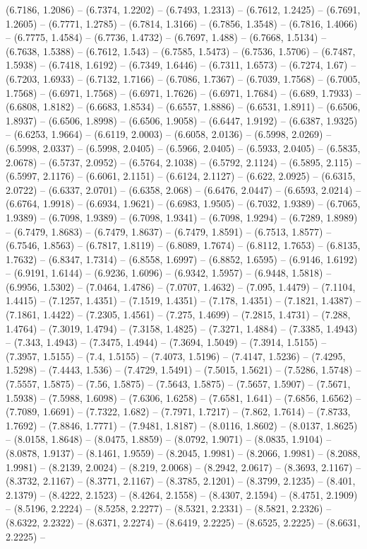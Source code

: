 (6.7186, 1.2086) -- (6.7374, 1.2202) -- (6.7493, 1.2313) -- (6.7612, 1.2425) -- (6.7691, 1.2605) -- (6.7771, 1.2785) -- (6.7814, 1.3166) -- (6.7856, 1.3548) -- (6.7816, 1.4066) -- (6.7775, 1.4584) -- (6.7736, 1.4732) -- (6.7697, 1.488) -- (6.7668, 1.5134) -- (6.7638, 1.5388) -- (6.7612, 1.543) -- (6.7585, 1.5473) -- (6.7536, 1.5706) -- (6.7487, 1.5938) -- (6.7418, 1.6192) -- (6.7349, 1.6446) -- (6.7311, 1.6573) -- (6.7274, 1.67) -- (6.7203, 1.6933) -- (6.7132, 1.7166) -- (6.7086, 1.7367) -- (6.7039, 1.7568) -- (6.7005, 1.7568) -- (6.6971, 1.7568) -- (6.6971, 1.7626) -- (6.6971, 1.7684) -- (6.689, 1.7933) -- (6.6808, 1.8182) -- (6.6683, 1.8534) -- (6.6557, 1.8886) -- (6.6531, 1.8911) -- (6.6506, 1.8937) -- (6.6506, 1.8998) -- (6.6506, 1.9058) -- (6.6447, 1.9192) -- (6.6387, 1.9325) -- (6.6253, 1.9664) -- (6.6119, 2.0003) -- (6.6058, 2.0136) -- (6.5998, 2.0269) -- (6.5998, 2.0337) -- (6.5998, 2.0405) -- (6.5966, 2.0405) -- (6.5933, 2.0405) -- (6.5835, 2.0678) -- (6.5737, 2.0952) -- (6.5764, 2.1038) -- (6.5792, 2.1124) -- (6.5895, 2.115) -- (6.5997, 2.1176) -- (6.6061, 2.1151) -- (6.6124, 2.1127) -- (6.622, 2.0925) -- (6.6315, 2.0722) -- (6.6337, 2.0701) -- (6.6358, 2.068) -- (6.6476, 2.0447) -- (6.6593, 2.0214) -- (6.6764, 1.9918) -- (6.6934, 1.9621) -- (6.6983, 1.9505) -- (6.7032, 1.9389) -- (6.7065, 1.9389) -- (6.7098, 1.9389) -- (6.7098, 1.9341) -- (6.7098, 1.9294) -- (6.7289, 1.8989) -- (6.7479, 1.8683) -- (6.7479, 1.8637) -- (6.7479, 1.8591) -- (6.7513, 1.8577) -- (6.7546, 1.8563) -- (6.7817, 1.8119) -- (6.8089, 1.7674) -- (6.8112, 1.7653) -- (6.8135, 1.7632) -- (6.8347, 1.7314) -- (6.8558, 1.6997) -- (6.8852, 1.6595) -- (6.9146, 1.6192) -- (6.9191, 1.6144) -- (6.9236, 1.6096) -- (6.9342, 1.5957) -- (6.9448, 1.5818) -- (6.9956, 1.5302) -- (7.0464, 1.4786) -- (7.0707, 1.4632) -- (7.095, 1.4479) -- (7.1104, 1.4415) -- (7.1257, 1.4351) -- (7.1519, 1.4351) -- (7.178, 1.4351) -- (7.1821, 1.4387) -- (7.1861, 1.4422) -- (7.2305, 1.4561) -- (7.275, 1.4699) -- (7.2815, 1.4731) -- (7.288, 1.4764) -- (7.3019, 1.4794) -- (7.3158, 1.4825) -- (7.3271, 1.4884) -- (7.3385, 1.4943) -- (7.343, 1.4943) -- (7.3475, 1.4944) -- (7.3694, 1.5049) -- (7.3914, 1.5155) -- (7.3957, 1.5155) -- (7.4, 1.5155) -- (7.4073, 1.5196) -- (7.4147, 1.5236) -- (7.4295, 1.5298) -- (7.4443, 1.536) -- (7.4729, 1.5491) -- (7.5015, 1.5621) -- (7.5286, 1.5748) -- (7.5557, 1.5875) -- (7.56, 1.5875) -- (7.5643, 1.5875) -- (7.5657, 1.5907) -- (7.5671, 1.5938) -- (7.5988, 1.6098) -- (7.6306, 1.6258) -- (7.6581, 1.641) -- (7.6856, 1.6562) -- (7.7089, 1.6691) -- (7.7322, 1.682) -- (7.7971, 1.7217) -- (7.862, 1.7614) -- (7.8733, 1.7692) -- (7.8846, 1.7771) -- (7.9481, 1.8187) -- (8.0116, 1.8602) -- (8.0137, 1.8625) -- (8.0158, 1.8648) -- (8.0475, 1.8859) -- (8.0792, 1.9071) -- (8.0835, 1.9104) -- (8.0878, 1.9137) -- (8.1461, 1.9559) -- (8.2045, 1.9981) -- (8.2066, 1.9981) -- (8.2088, 1.9981) -- (8.2139, 2.0024) -- (8.219, 2.0068) -- (8.2942, 2.0617) -- (8.3693, 2.1167) -- (8.3732, 2.1167) -- (8.3771, 2.1167) -- (8.3785, 2.1201) -- (8.3799, 2.1235) -- (8.401, 2.1379) -- (8.4222, 2.1523) -- (8.4264, 2.1558) -- (8.4307, 2.1594) -- (8.4751, 2.1909) -- (8.5196, 2.2224) -- (8.5258, 2.2277) -- (8.5321, 2.2331) -- (8.5821, 2.2326) -- (8.6322, 2.2322) -- (8.6371, 2.2274) -- (8.6419, 2.2225) -- (8.6525, 2.2225) -- (8.6631, 2.2225) -- 